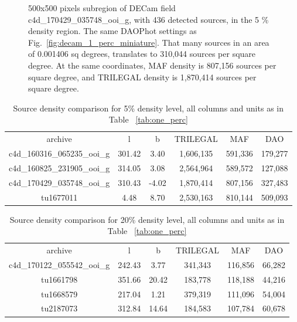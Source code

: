 \documentclass[DM,lsstdraft,toc,usenatbib]{lsstdoc}
\begin{document}
\begin{figure}
\begin{minipage}[t]{0.5\linewidth}
\caption{500x500 pixels subregion of DECam field c4d\_170429\_035748\_ooi\_g,  with 436  detected sources, in the 5 \% density region. The same DAOPhot settings as Fig.~\ref{fig:decam_1_perc_miniature}. That many sources in an area of 0.001406 sq degrees,  translates to 310,044 sources per square degree. At the same coordinates, MAF density is 807,156 sources per square degree, and TRILEGAL density is 1,870,414 sources per square degree. }
\label{fig:decam_5_perc_miniature}
\end{minipage}%
\end{figure}





\begin{table}
\begin{tabular}{cccccc}
archive & l & b & TRILEGAL & MAF & DAO \\
c4d\_160316\_065235\_ooi\_g & 301.42 & 3.40 & 1,606,135 & 591,336 & 179,277 \\
c4d\_160825\_231905\_ooi\_g & 314.05 & 3.08 & 2,564,964 & 589,572 & 127,088 \\
c4d\_170429\_035748\_ooi\_g & 310.43 & -4.02 & 1,870,414 & 807,156 & 327,483 \\
tu1677011 & 4.48 & 8.70 & 2,530,163 & 810,144 & 509,093 \\
\end{tabular}
\caption{Source density comparison for 5\% density level, all columns and units as in Table ~\ref{tab:one_perc}}
\label{tab:five_perc}
\end{table}



\begin{table}
\begin{tabular}{cccccc}
archive & l & b & TRILEGAL & MAF & DAO \\
c4d\_170122\_055542\_ooi\_g & 242.43 & 3.77 & 341,343 & 116,856 & 66,282 \\
tu1661798 & 351.66 & 20.42 & 183,778 & 118,188 & 44,216 \\
tu1668579 & 217.04 & 1.21 & 379,319 & 111,096 & 54,004 \\
tu2187073 & 312.84 & 14.64 & 184,583 & 107,784 & 60,678 \\
\end{tabular}
\caption{Source density comparison for 20\% density level, all columns and units as in Table ~\ref{tab:one_perc}}
\label{tab:twenty_perc}
\end{table}
\end{document}
